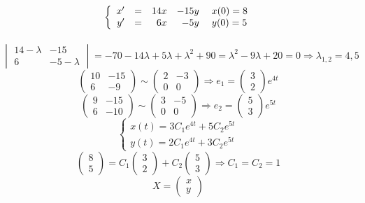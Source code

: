\documentclass[12pt]{article}
\begin{document}
\section{\[
      \left\{\begin{array}{rrrr}
          x' & = & 14x & -15y \\
          y' & = & 6x  & - 5y
      \end{array}\right.
      \\
      \begin{array}{l}
          x(0) = 8 \\
          y(0) = 5
      \end{array}
  \]}
\[
    \begin{vmatrix}
        14 - \lambda & -15          \\
        6            & -5 - \lambda
    \end{vmatrix}
    = -70 - 14\lambda + 5\lambda + \lambda^2 + 90
    = \lambda^2 - 9\lambda + 20 = 0
    \Rightarrow
    \lambda_{1,2} = 4, 5
\]
\[
    \begin{pmatrix}
        10 & -15 \\
        6  & -9
    \end{pmatrix}
    \sim
    \begin{pmatrix}
        2 & -3 \\
        0 & 0
    \end{pmatrix}
    \Rightarrow
    e_1 = \begin{pmatrix}3 \\ 2\end{pmatrix}e^{4t}
\]
\[
    \begin{pmatrix}
        9 & -15 \\
        6 & -10
    \end{pmatrix}
    \sim
    \begin{pmatrix}
        3 & -5 \\
        0 & 0
    \end{pmatrix}
    \Rightarrow
    e_2 = \begin{pmatrix}5 \\ 3\end{pmatrix}e^{5t}
\]
\[
    \begin{cases}
        x(t) = 3C_1e^{4t} + 5C_2e^{5t} \\
        y(t) = 2C_1e^{4t} + 3C_2e^{5t}
    \end{cases}
\]
\[
    \begin{pmatrix}8 \\ 5 \end{pmatrix}
    =
    C_1\begin{pmatrix}3 \\ 2\end{pmatrix}
    +
    C_2\begin{pmatrix}5 \\ 3\end{pmatrix}
    \Rightarrow
    C_1 = C_2 = 1
\]
\[
    X = \begin{pmatrix} x\\y \end{pmatrix}
\]
\end{document}
